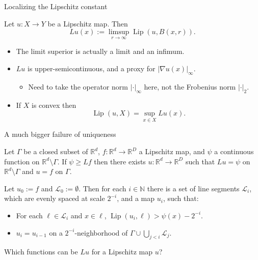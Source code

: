 \documentclass[10pt]{beamer}
\newcommand{\NN}{\mathbb{N}}
\newcommand{\RR}{\mathbb{R}}
\DeclareMathOperator{\Lip}{Lip}
\begin{document}
\begin{frame}{Localizing the Lipschitz constant}
\begin{definition}
Let $u: X \to Y$ be a Lipschitz map. Then
$$Lu(x) := \limsup_{r \to \infty} \Lip(u, B(x, r)).$$
\end{definition}

\begin{itemize}
\item The limit superior is actually a limit and an infimum.
\item $Lu$ is upper-semicontinuous, and a proxy for $|\nabla u(x)|_\infty$.
\begin{itemize}
\item Need to take the operator norm $|\cdot|_\infty$ here, not the Frobenius norm $|\cdot|_2$.
\end{itemize}
\item If $X$ is convex then 
$$\Lip(u, X) = \sup_{x \in X} Lu(x).$$
\end{itemize}
\end{frame}

\begin{frame}{A much bigger failure of uniqueness}

\begin{theorem}
Let $\Gamma$ be a closed subset of $\RR^d$, $f: \RR^d \to \RR^D$ a Lipschitz map, and $\psi$ a continuous function on $\RR^d \setminus \Gamma$.
If $\psi \geq Lf$ then there exists $u: \RR^d \to \RR^D$ such that $Lu = \psi$ on $\RR^d \setminus \Gamma$ and $u = f$ on $\Gamma$.
\end{theorem}

\begin{lemma}
Let $u_0 := f$ and $\mathscr L_0 := \emptyset$.
Then for each $i \in \NN$ there is a set of line segments $\mathscr L_i$, which are evenly spaced at scale $2^{-i}$, and a map $u_i$, such that:
\begin{itemize}
\item For each $\ell \in \mathscr L_i$ and $x \in \ell$, $\Lip(u_i, \ell) > \psi(x) - 2^{-i}$.
\item $u_i = u_{i - 1}$ on a $2^{-i}$-neighborhood of $\Gamma \cup \bigcup_{j < i} \mathscr L_j$.
\end{itemize}
\end{lemma}

\begin{problem}
Which functions can be $Lu$ for a Lipschitz map $u$?
\end{problem}
    
\end{frame}
\end{document}

